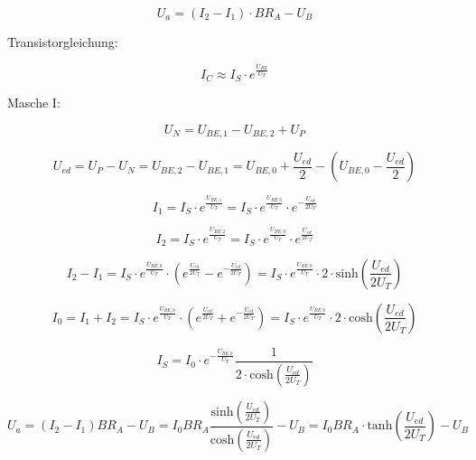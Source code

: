 \begin{equation}
    U_a = (I_2 - I_1) \cdot B R_A - U_B
\end{equation}

Transistorgleichung:

\begin{equation}
    I_C \approx I_S \cdot e^{\frac{U_{BE}}{U_T}}
\end{equation}

Masche I:

\begin{equation}
    U_N = U_{BE,1} - U_{BE,2} + U_P
\end{equation}

\begin{equation}
    U_{ed}  = U_P - U_N =  U_{BE,2} - U_{BE,1} = U_{BE,0} + \frac{U_{ed}}{2} - (U_{BE,0} - \frac{U_{ed}}{2})
\end{equation}

\begin{equation}
    I_1 = I_S \cdot e^{\frac{U_{BE,1}}{U_T}} = I_S \cdot e^{\frac{U_{BE,0}}{U_T}} \cdot e^{-\frac{U_{ed}}{2U_T}}
\end{equation}

\begin{equation}
    I_2 = I_S \cdot e^{\frac{U_{BE,2}}{U_T}} = I_S \cdot e^{\frac{U_{BE,0}}{U_T}} \cdot e^{\frac{U_{ed}}{2U_T}}
\end{equation}

\begin{equation}
    I_2 - I_1 = I_S \cdot e^{\frac{U_{BE,0}}{U_T}} \cdot ( e^{\frac{U_{ed}}{2U_T}} - e^{-\frac{U_{ed}}{2U_T}} ) = I_S \cdot e^{\frac{U_{BE,0}}{U_T}} \cdot 2 \cdot \text{sinh}\left( \frac{U_{ed}}{2U_T}  \right)
\end{equation}

\begin{equation}
    I_0 = I_1 + I_2 = I_S \cdot e^{\frac{U_{BE,0}}{U_T}} \cdot ( e^{\frac{U_{ed}}{2U_T}} + e^{-\frac{U_{ed}}{2U_T}} ) = I_S \cdot e^{\frac{U_{BE,0}}{U_T}} \cdot 2 \cdot \text{cosh}\left( \frac{U_{ed}}{2U_T}  \right)
\end{equation}

\begin{equation}
    I_S = I_0 \cdot e^{-\frac{U_{BE,0}}{U_T}} \frac{1}{2 \cdot \text{cosh}\left( \frac{U_{ed}}{2U_T}  \right)}
\end{equation}

\begin{equation}
    U_a = ( I_2 - I_1 ) B R_A - U_B = I_0BR_A \frac{\text{sinh}\left( \frac{U_{ed}}{2U_T}  \right)}{\text{cosh}\left( \frac{U_{ed}}{2U_T}  \right)} - U_B = I_0BR_A \cdot \text{tanh}\left( \frac{U_{ed}}{2U_T} \right) - U_B
\end{equation}

